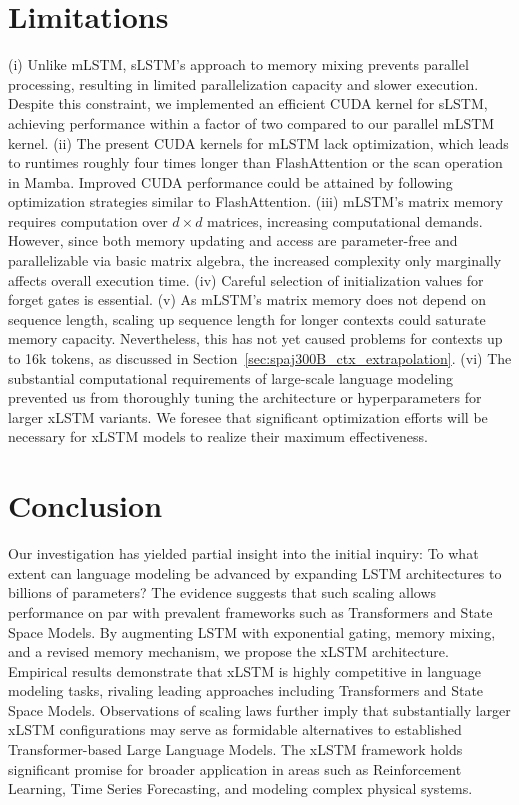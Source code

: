 \section{Limitations}

(i) Unlike mLSTM, sLSTM's approach to memory mixing prevents parallel processing, resulting in limited parallelization capacity and slower execution. Despite this constraint, we implemented an efficient CUDA kernel for sLSTM, achieving performance within a factor of two compared to our parallel mLSTM kernel. (ii) The present CUDA kernels for mLSTM lack optimization, which leads to runtimes roughly four times longer than FlashAttention or the scan operation in Mamba. Improved CUDA performance could be attained by following optimization strategies similar to FlashAttention. (iii) mLSTM’s matrix memory requires computation over $d \times d$ matrices, increasing computational demands. However, since both memory updating and access are parameter-free and parallelizable via basic matrix algebra, the increased complexity only marginally affects overall execution time. (iv) Careful selection of initialization values for forget gates is essential. (v) As mLSTM’s matrix memory does not depend on sequence length, scaling up sequence length for longer contexts could saturate memory capacity. Nevertheless, this has not yet caused problems for contexts up to 16k tokens, as discussed in Section~\ref{sec:spaj300B_ctx_extrapolation}. (vi) The substantial computational requirements of large-scale language modeling prevented us from thoroughly tuning the architecture or hyperparameters for larger xLSTM variants. We foresee that significant optimization efforts will be necessary for xLSTM models to realize their maximum effectiveness.

\section{Conclusion}
Our investigation has yielded partial insight into the initial inquiry: To what extent can language modeling be advanced by expanding LSTM architectures to billions of parameters? The evidence suggests that such scaling allows performance on par with prevalent frameworks such as Transformers and State Space Models. By augmenting LSTM with exponential gating, memory mixing, and a revised memory mechanism, we propose the xLSTM architecture. Empirical results demonstrate that xLSTM is highly competitive in language modeling tasks, rivaling leading approaches including Transformers and State Space Models. Observations of scaling laws further imply that substantially larger xLSTM configurations may serve as formidable alternatives to established Transformer-based Large Language Models. The xLSTM framework holds significant promise for broader application in areas such as Reinforcement Learning, Time Series Forecasting, and modeling complex physical systems.


